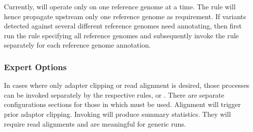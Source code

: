 \documentclass[letterpaper,10pt,english]{sphinxhowto}
\begin{document}
\begin{sphinxVerbatim}[commandchars=\\\{\}]
 
\end{sphinxVerbatim}

Currently,  will operate only on one reference genome at a time. The rule will hence propagate upstream only one reference genome as requirement. If variants detected against several different reference genomes need annotating, then first run the  rule specifying all reference genomes and subsequently invoke the  rule separately for each reference genome annotation.


\subsubsection{Expert Options}
\label{\detokenize{index:expert-options}}
In cases where only adapter clipping or read alignment is desired, those processes can be invoked separately by the respective rules,   or . There are separate configurations sections for those in  which must be used. Alignment will trigger prior adaptor clipping.
Invoking  will produce summary statistics. They will require read alignments and are meaningful for generic  runs.
\end{document}
